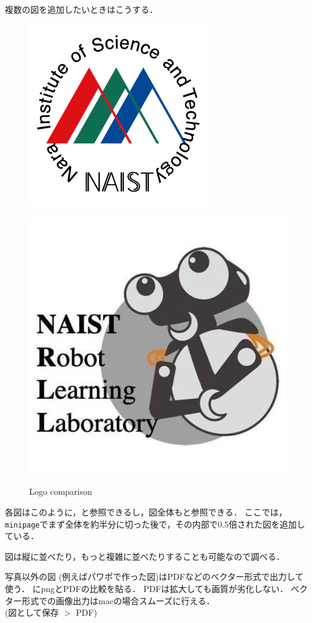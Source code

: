 複数の図を追加したいときはこうする．
\begin{figure}[t]
    \centering
  \begin{minipage}{0.49\linewidth}
    \centering
    \includegraphics[clip, trim=0 0 0 0, width=0.5\linewidth]{figures/logomark_Rnasi.png}
    \label{fig: naist_logo}
  \end{minipage}
  \begin{minipage}{0.49\linewidth}
    \centering
    \includegraphics[clip, trim=0 0 0 0, width=0.5\linewidth]{figures/rll_logo.png}
    \label{fig: rll_logo}
  \end{minipage}
  \caption{Logo comparison}
  \label{fig: logo_comp}
\end{figure}

各図はこのように，と参照できるし，図全体もと参照できる．
ここでは，\texttt{minipage}でまず全体を約半分に切った後で，その内部で$0.5$倍された図を追加している．

図は縦に並べたり，もっと複雑に並べたりすることも可能なので調べる．

\newpage
写真以外の図 (例えばパワポで作った図)はPDFなどのベクター形式で出力して使う．
にpngとPDFの比較を貼る．
PDFは拡大しても画質が劣化しない．
ベクター形式での画像出力はmacの場合スムーズに行える． \\(図として保存 $>$ PDF)

